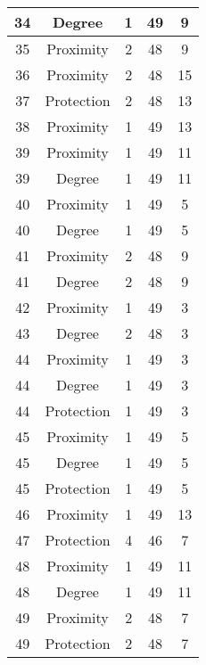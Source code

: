 \documentclass[results.tex]{subfiles}
\begin{document}
\begin{center}
\begin{tabular}{| c || c | c | c | c |}
    34 & Degree & 1 & 49 & 9 \\ 
    \hline
    35 & Proximity & 2 & 48 & 9 \\ 
    \hline
    36 & Proximity & 2 & 48 & 15 \\ 
    \hline
    37 & Protection & 2 & 48 & 13 \\ 
    \hline
    38 & Proximity & 1 & 49 & 13 \\ 
    \hline
    39 & Proximity & 1 & 49 & 11 \\ 
    \hline
    39 & Degree & 1 & 49 & 11 \\ 
    \hline
    40 & Proximity & 1 & 49 & 5 \\ 
    \hline
    40 & Degree & 1 & 49 & 5 \\ 
    \hline
    41 & Proximity & 2 & 48 & 9 \\ 
    \hline
    41 & Degree & 2 & 48 & 9 \\ 
    \hline
    42 & Proximity & 1 & 49 & 3 \\ 
    \hline
    43 & Degree & 2 & 48 & 3 \\ 
    \hline
    44 & Proximity & 1 & 49 & 3 \\ 
    \hline
    44 & Degree & 1 & 49 & 3 \\ 
    \hline
    44 & Protection & 1 & 49 & 3 \\ 
    \hline
    45 & Proximity & 1 & 49 & 5 \\ 
    \hline
    45 & Degree & 1 & 49 & 5 \\ 
    \hline
    45 & Protection & 1 & 49 & 5 \\ 
    \hline
    46 & Proximity & 1 & 49 & 13 \\ 
    \hline
    47 & Protection & 4 & 46 & 7 \\ 
    \hline
    48 & Proximity & 1 & 49 & 11 \\ 
    \hline
    48 & Degree & 1 & 49 & 11 \\ 
    \hline
    49 & Proximity & 2 & 48 & 7 \\ 
    \hline
    49 & Protection & 2 & 48 & 7 \\ 
    \hline   \end{tabular}
\end{center}
\end{document}
